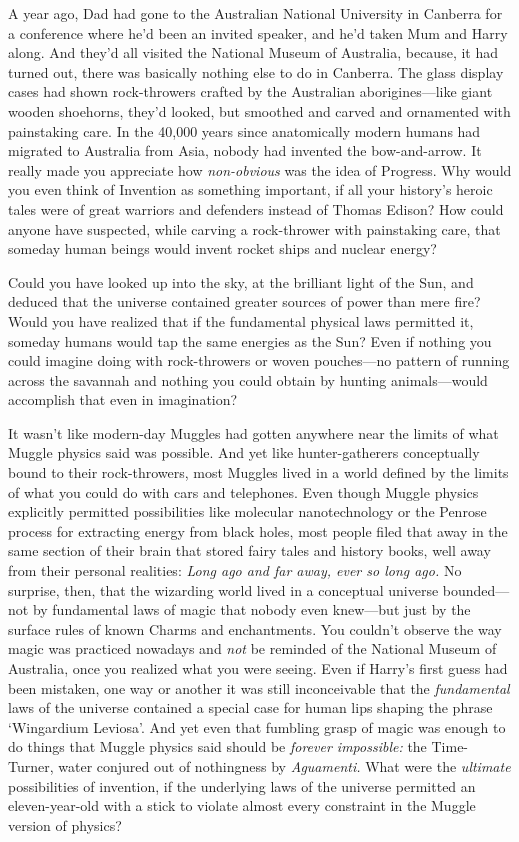 A year ago, Dad had gone to the Australian National University in Canberra for
a conference where he'd been an invited speaker, and he'd taken Mum and Harry
along. And they'd all visited the National Museum of Australia, because, it had
turned out, there was basically nothing else to do in Canberra. The glass
display cases had shown rock-throwers crafted by the Australian
aborigines---like giant wooden shoehorns, they'd looked, but smoothed and
carved and ornamented with painstaking care. In the 40,000 years since
anatomically modern humans had migrated to Australia from Asia, nobody had
invented the bow-and-arrow. It really made you appreciate how
\emph{non-obvious} was the idea of Progress. Why would you even think of
Invention as something important, if all your history's heroic tales were of
great warriors and defenders instead of Thomas Edison? How could anyone have
suspected, while carving a rock-thrower with painstaking care, that someday
human beings would invent rocket ships and nuclear energy?

Could you have looked up into the sky, at the brilliant light of the Sun, and
deduced that the universe contained greater sources of power than mere fire?
Would you have realized that if the fundamental physical laws permitted it,
someday humans would tap the same energies as the Sun? Even if nothing you
could imagine doing with rock-throwers or woven pouches---no pattern of running
across the savannah and nothing you could obtain by hunting animals---would
accomplish that even in imagination?

It wasn't like modern-day Muggles had gotten anywhere near the limits of what
Muggle physics said was possible. And yet like hunter-gatherers conceptually
bound to their rock-throwers, most Muggles lived in a world defined by the
limits of what you could do with cars and telephones. Even though Muggle
physics explicitly permitted possibilities like molecular nanotechnology or the
Penrose process for extracting energy from black holes, most people filed that
away in the same section of their brain that stored fairy tales and history
books, well away from their personal realities: \emph{Long ago and far away,
ever so long ago.} No surprise, then, that the wizarding world lived in a
conceptual universe bounded---not by fundamental laws of magic that nobody even
knew---but just by the surface rules of known Charms and enchantments. You
couldn't observe the way magic was practiced nowadays and \emph{not} be
reminded of the National Museum of Australia, once you realized what you were
seeing. Even if Harry's first guess had been mistaken, one way or another it
was still inconceivable that the \emph{fundamental} laws of the universe
contained a special case for human lips shaping the phrase `Wingardium
Leviosa'. And yet even that fumbling grasp of magic was enough to do things
that Muggle physics said should be \emph{forever impossible:} the Time-Turner,
water conjured out of nothingness by \emph{Aguamenti.} What were the
\emph{ultimate} possibilities of invention, if the underlying laws of the
universe permitted an eleven-year-old with a stick to violate almost every
constraint in the Muggle version of physics?


